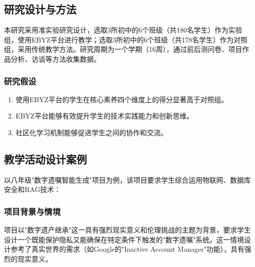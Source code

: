 \documentclass[12pt,a4paper,fontset=fandol]{ctexart}
\begin{document}
\subsection{研究设计与方法}
本研究采用准实验研究设计，选取3所初中的6个班级（共180名学生）作为实验组，使用EBYZ平台进行教学；选取3所初中的6个班级（共178名学生）作为对照组，采用传统教学方法。研究周期为一个学期（16周），通过前后测问卷、项目作品分析、访谈等方法收集数据。

\subsubsection{研究假设}
\begin{enumerate}
    \item 使用EBYZ平台的学生在核心素养四个维度上的得分显著高于对照组。
    \item EBYZ平台能够有效提升学生的技术实践能力和创新思维。
    \item 社区化学习机制能够促进学生之间的协作和交流。
\end{enumerate}

\subsection{教学活动设计案例}
以八年级"数字遗嘱智能生成"项目为例，该项目要求学生综合运用物联网、数据库安全和RAG技术：

\subsubsection{项目背景与情境}
项目以"数字遗产继承"这一具有强烈现实意义和伦理挑战的主题为背景，要求学生设计一个既能保护隐私又能确保在特定条件下触发的"数字遗嘱"系统。这一情境设计参考了真实世界的需求（如Google的"Inactive Account Manager"功能），具有强烈的现实意义。
\end{document}

